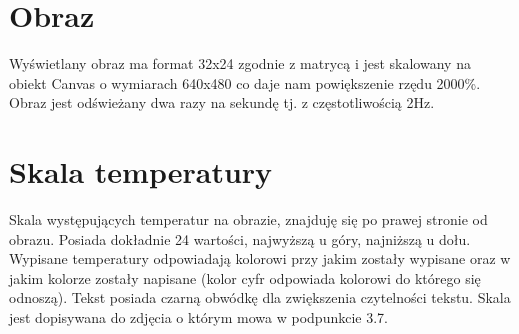 \documentclass[a4paper,twoside,12pt]{book}
\begin{document}
\section {Obraz}
Wyświetlany obraz ma format 32x24 zgodnie z matrycą i jest skalowany na obiekt Canvas o wymiarach 640x480 co daje nam powiększenie rzędu 2000\%. Obraz jest odświeżany dwa razy na sekundę tj. z częstotliwością 2Hz.
\section{Skala temperatury} 
Skala występujących temperatur na obrazie, znajduję się po prawej stronie od obrazu. Posiada dokładnie 24 wartości, najwyższą u góry, najniższą u dołu. Wypisane temperatury odpowiadają kolorowi przy jakim zostały wypisane oraz w jakim kolorze zostały napisane (kolor cyfr odpowiada kolorowi do którego się odnoszą). Tekst posiada czarną obwódkę dla zwiększenia czytelności tekstu. Skala jest dopisywana do zdjęcia o którym mowa w podpunkcie 3.7.
\end{document}
